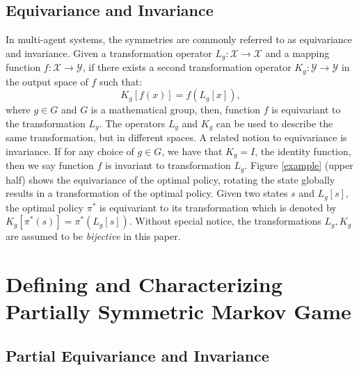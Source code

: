 \documentclass[letterpaper]{article} %
\theoremstyle{definition}
\begin{document}
\subsection{Equivariance and Invariance}

In multi-agent systems, the symmetries are commonly referred to as equivariance and invariance\cite{yu2023esp}. Given a transformation operator $L_g: \mathcal{X} \rightarrow \mathcal{X}$ and a mapping function $f: \mathcal{X} \rightarrow \mathcal{Y}$, if there exists a second transformation operator $K_g: \mathcal{Y} \rightarrow \mathcal{Y}$ in the output space of $f$ such that:
\begin{equation*}
    K_g[f(x)]=f\left(L_g[x]\right),
\end{equation*}
where $g \in G$ and $G$ is a mathematical group, then, function $f$ is equivariant to the transformation $L_g$. The operators $L_g$ and $K_g$ can be used to describe the same transformation, but in different spaces. A related notion to equivariance is invariance. If for any choice of $g \in G$, we have that $K_g=I$, the identity function, then we say function $f$ is invariant to transformation $L_g$. Figure \ref{example} (upper half) shows the equivariance of the optimal policy, rotating the state globally results in a transformation of the optimal policy. Given two states $s$ and $L_g[s]$, the optimal policy $\pi^*$ is equivariant to its transformation which is denoted by $ K_g[\pi^*(s)]=\pi^*\left(L_g[s]\right)$. Without special notice, the transformations $L_g, K_g$ are assumed to be \textit{bijective} in this paper.



\section{Defining and Characterizing Partially Symmetric Markov Game}
\subsection{Partial Equivariance and Invariance}
\end{document}
